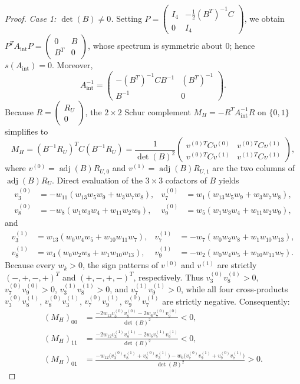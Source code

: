 \documentclass[10pt,letterpaper]{article}
\theoremstyle{zetaplain}
\theoremstyle{zetadef}
\theoremstyle{remark}
\numberwithin{equation}{section}
\DeclareMathOperator{\adj}{adj}
\begin{document}
\begin{proof}
\medskip
\emph{Case 1: $\det(B) \ne 0$.} Setting $P = \begin{pmatrix} I_4 & -\frac{1}{2}(B^T)^{-1}C \\ 0 & I_4 \end{pmatrix}$, we obtain $P^T A_{\mathrm{int}} P = \begin{pmatrix} 0 & B \\ B^T & 0 \end{pmatrix}$, whose spectrum is symmetric about $0$; hence $s(A_{\mathrm{int}}) = 0$. Moreover,
\[
  A_{\mathrm{int}}^{-1} = \begin{pmatrix} -(B^T)^{-1} C B^{-1} & (B^T)^{-1} \\ B^{-1} & 0 \end{pmatrix}.
\]
Because $R = \begin{pmatrix} R_U \\ 0 \end{pmatrix}$, the $2 \times 2$ Schur complement $M_H = -R^T A_{\mathrm{int}}^{-1} R$ on $\{0, 1\}$ simplifies to
\[
  M_H = (B^{-1} R_U)^T C (B^{-1} R_U) = \frac{1}{\det(B)^2} \begin{pmatrix} v^{(0)T} C v^{(0)} & v^{(0)T} C v^{(1)} \\ v^{(0)T} C v^{(1)} & v^{(1)T} C v^{(1)} \end{pmatrix},
\]
where $v^{(0)} = \adj(B) R_{U,0}$ and $v^{(1)} = \adj(B) R_{U,1}$ are the two columns of $\adj(B) R_U$. Direct evaluation of the $3 \times 3$ cofactors of $B$ yields
\begin{align*}
  v^{(0)}_3 &= -w_{11}(w_{13} w_5 w_9 + w_3 w_7 w_8), & v^{(0)}_7 &= w_1(w_{13} w_5 w_9 + w_3 w_7 w_8), \\
  v^{(0)}_8 &= -w_8(w_1 w_3 w_4 + w_{11} w_2 w_9), & v^{(0)}_9 &= w_5(w_1 w_3 w_4 + w_{11} w_2 w_9),
\end{align*}
and
\begin{align*}
  v^{(1)}_3 &= w_{13}(w_0 w_4 w_5 + w_{10} w_{11} w_7), & v^{(1)}_7 &= -w_7(w_0 w_2 w_8 + w_1 w_{10} w_{13}), \\
  v^{(1)}_8 &= w_4(w_0 w_2 w_8 + w_1 w_{10} w_{13}), & v^{(1)}_9 &= -w_2(w_0 w_4 w_5 + w_{10} w_{11} w_7).
\end{align*}
Because every $w_k > 0$, the sign patterns of $v^{(0)}$ and $v^{(1)}$ are strictly $(-, +, -, +)^T$ and $(+, -, +, -)^T$, respectively. Thus $v^{(0)}_3 v^{(0)}_8 > 0$, $v^{(0)}_7 v^{(0)}_9 > 0$, $v^{(1)}_3 v^{(1)}_8 > 0$, and $v^{(1)}_7 v^{(1)}_9 > 0$, while all four cross-products $v^{(0)}_3 v^{(1)}_8$, $v^{(0)}_8 v^{(1)}_3$, $v^{(0)}_7 v^{(1)}_9$, $v^{(0)}_9 v^{(1)}_7$ are strictly negative. Consequently:
\begin{align*}
  (M_H)_{00} &= \frac{-2w_{12} v^{(0)}_3 v^{(0)}_8 - 2w_6 v^{(0)}_7 v^{(0)}_9}{\det(B)^2} < 0, \\
  (M_H)_{11} &= \frac{-2w_{12} v^{(1)}_3 v^{(1)}_8 - 2w_6 v^{(1)}_7 v^{(1)}_9}{\det(B)^2} < 0, \\
  (M_H)_{01} &= \frac{-w_{12}\bigl(v^{(0)}_3 v^{(1)}_8 + v^{(0)}_8 v^{(1)}_3\bigr) - w_6\bigl(v^{(0)}_7 v^{(1)}_9 + v^{(0)}_9 v^{(1)}_7\bigr)}{\det(B)^2} > 0.
\end{align*}


\end{proof}
\end{document}
